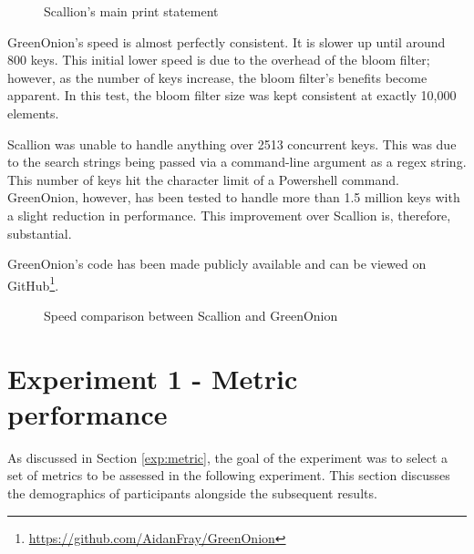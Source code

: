 \begin{figure}[h!]
    
    \caption{Scallion's main print statement}
    \label{fig:scallionCode}
\end{figure}

GreenOnion's speed is almost perfectly consistent. It is slower up until  around 800 keys. This initial lower speed is due to the overhead of the bloom filter; however, as the number of keys increase, the bloom filter's benefits become apparent. In this test, the bloom filter size was kept consistent at exactly 10,000 elements. 

Scallion was unable to handle anything over 2513 concurrent keys. This was due to the search strings being passed via a command-line argument as a regex string. This number of keys hit the character limit of a Powershell command. GreenOnion, however, has been tested to handle more than 1.5 million keys with a slight reduction in performance. This improvement over Scallion is, therefore, substantial.

GreenOnion's code has been made publicly available and can be viewed on GitHub\footnote{\url{https://github.com/AidanFray/GreenOnion}}.

\begin{figure}[h!]
    \centering
    
    \label{tab:scallion_speed}
    \caption{Speed comparison between Scallion and GreenOnion}
\end{figure}

\newpage

\section{Experiment 1 - Metric performance}

As discussed in Section \ref{exp:metric}, the goal of the experiment was to select a set of metrics to be assessed in the following experiment. This section discusses the demographics of participants alongside the subsequent results.

